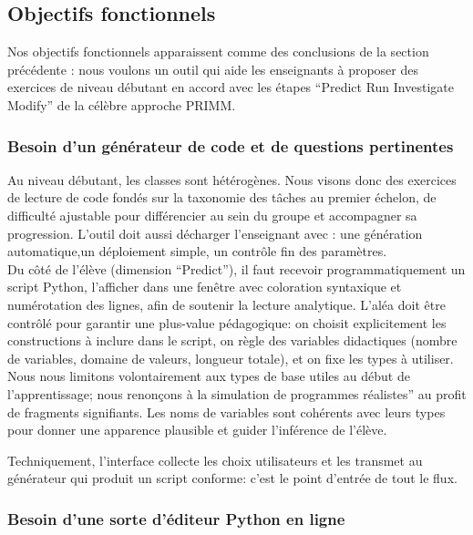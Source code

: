 \documentclass[11pt,a4paper]{article}
\begin{document}
\subsection{Objectifs fonctionnels}
Nos objectifs fonctionnels apparaissent comme des conclusions de la section précédente : nous voulons un outil qui aide les enseignants à proposer des exercices de niveau débutant en accord avec les étapes ``Predict Run Investigate Modify'' de la célèbre approche PRIMM.

\subsubsection{Besoin d'un générateur de code et de questions pertinentes}

Au niveau débutant, les classes sont hétérogènes. Nous visons donc des exercices de lecture de code fondés sur la taxonomie des tâches au premier échelon, de difficulté ajustable pour différencier au sein du groupe et accompagner sa progression. L'outil doit aussi décharger l'enseignant avec : une génération automatique,un déploiement simple, un contrôle fin des paramètres.
\\
Du côté de l'élève (dimension ``Predict''), il faut recevoir programmatiquement un script Python, l'afficher dans une fenêtre avec coloration syntaxique et numérotation des lignes, afin de soutenir la lecture analytique. L'aléa doit être contrôlé pour garantir une plus-value pédagogique: on choisit explicitement les constructions à inclure dans le script, on règle des variables didactiques (nombre de variables, domaine de valeurs, longueur totale), et on fixe les types à utiliser. Nous nous limitons volontairement aux types de base utiles au début de l'apprentissage; nous renonçons à la simulation de programmes réalistes'' au profit de fragments signifiants. Les noms de variables sont cohérents avec leurs types pour donner une apparence plausible et guider l'inférence de l'élève.

Techniquement, l'interface collecte les choix utilisateurs et les transmet au générateur qui produit un script conforme: c'est le point d'entrée de tout le flux.

\subsubsection{Besoin d'une sorte d'éditeur Python en ligne}
\end{document}
